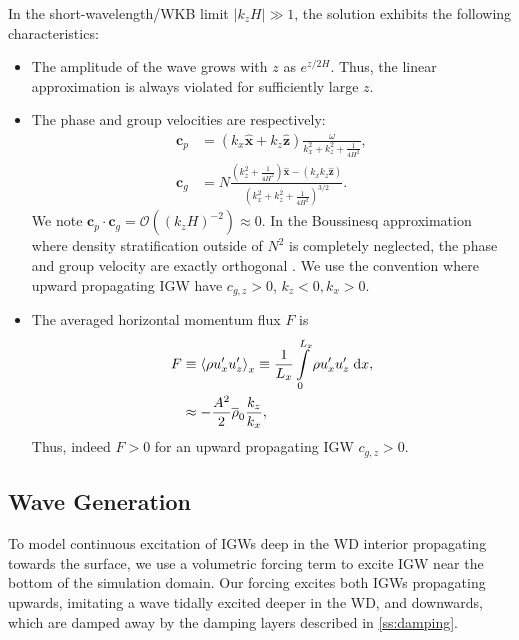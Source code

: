 \documentclass[
        fleqn,
        usenatbib,
    ]{mnras}
\newcommand*{\abs}[1]{\left|#1\right|}
\newcommand*{\ev}[1]{\left\langle#1\right\rangle}
\newcommand*{\p}[1]{\left(#1\right)}
\newcommand*{\bm}[1]{\mathbf{#1}}
\newcommand*{\uv}[1]{\hat{\mathbf{#1}}}
\begin{document}
In the short-wavelength/WKB limit $\abs{k_{z}H} \gg 1$, the solution exhibits
the following characteristics:
\begin{itemize}
    \item The amplitude of the wave grows with $z$ as $e^{z/2H}$. Thus, the
        linear approximation is always violated for sufficiently large $z$.

    \item The phase and group velocities are respectively:
        \begin{align}
            \bm{c}_{p} &=
                \p{k_{x}\uv{x} + k_{z}\uv{z}}\frac{\omega}
                {k_{x}^2 + k_{z}^2 + \frac{1}{4H^2}},\\
            \bm{c}_{g} &= N\frac{\p{k_{z}^2 + \frac{1}{4H^2}}\uv{x}
                - \p{k_{x}k_{z}\uv{z}}}
                {\p{k_{x}^2 + k_{z}^2 + \frac{1}{4H^2}}^{3/2}}.\label{eq:vg}
        \end{align}
        We note $\bm{c}_{p} \cdot \bm{c}_g = \mathcal{O}\p{ \p{k_{z}H}^{-2} }
        \approx 0$. In the Boussinesq approximation where density stratification
        outside of $N^2$ is completely neglected, the phase and group velocity
        are exactly orthogonal \citep{drazin,sutherland1}. We use the convention
        where upward propagating IGW have $c_{g, z} > 0$, $k_z < 0, k_x > 0$.

    \item The averaged horizontal momentum flux $F$ is
        \begin{align}
            F &\equiv \ev{\rho u_{x}' u_{z}'}_x \equiv
                \frac{1}{L_x}\int_0^{L_x}\limits \rho u_{x}'u_{z}'\;\mathrm{d}x,
                    \label{eq:F_def}\\
                &\approx -\frac{A^2}{2}\overline{\rho}_0\frac{k_{z}}{k_{x}},
                    \label{eq:S_lin}
        \end{align}
        Thus, indeed $F > 0$ for an upward propagating IGW $c_{g, z} > 0$.
\end{itemize}

\subsection{Wave Generation}

To model continuous excitation of IGWs deep in the WD interior propagating
towards the surface, we use a volumetric forcing term to excite IGW near the
bottom of the simulation domain. Our forcing excites both IGWs
propagating upwards, imitating a wave tidally excited deeper in the WD, and
downwards, which are damped away by the damping layers described in
\autoref{ss:damping}.
\end{document}

